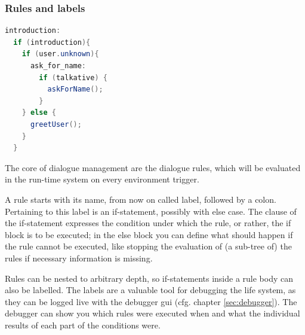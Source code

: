 \subsubsection{Rules and labels}

\begin{small}
\begin{lstlisting}[language=Java]
introduction:
  if (introduction){
    if (user.unknown){
      ask_for_name:
        if (talkative) {
          askForName();
        }
    } else {
      greetUser();
    }
  }
\end{lstlisting}
\end{small}

%
The core of \vonda dialogue management are the dialogue rules, which will be evaluated in the run-time system on every environment trigger.

A rule starts with its name, from now on called label, followed by a colon. Pertaining to this label is an if-statement, possibly with else case. The clause of the if-statement expresses the condition under which the rule, or rather, the if block is to be executed; in the else block you can define what should happen if the rule cannot be executed, like stopping the evaluation of (a sub-tree of) the rules if necessary information is missing.

%
Rules can be nested to arbitrary depth, so if-statements inside a rule body can also be labelled. The labels are a valuable tool for debugging the life system, as they can be logged live with the debugger gui (cfg. chapter \ref{sec:debugger}). The debugger can show you which rules were executed when and what the individual results of each part of the conditions were.



